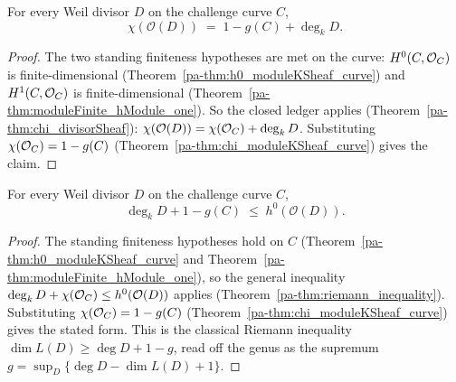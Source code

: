\begin{theorem}
  \label{pa-thm:chi_divisorSheaf_curve}
  \leanok

  For every Weil divisor \(D\) on the challenge curve \(C\),
  \[
    \chi(\mathcal O(D)) \;=\; 1 - g(C) + \deg_k D .
  \]
\end{theorem}
\begin{proof}
  \leanok
  The two standing finiteness hypotheses are met on the curve: \(H^0(C, \mathcal{O}_{C})\) is
  finite-dimensional (Theorem~\ref{pa-thm:h0_moduleKSheaf_curve}) and \(H^1(C, \mathcal{O}_{C})\) is
  finite-dimensional (Theorem~\ref{pa-thm:moduleFinite_hModule_one}). So the closed ledger applies
  (Theorem~\ref{pa-thm:chi_divisorSheaf}): \(\chi(\mathcal O(D)) = \chi(\mathcal{O}_{C}) + \deg_k D\).
  Substituting \(\chi(\mathcal{O}_{C}) = 1 - g(C)\) (Theorem~\ref{pa-thm:chi_moduleKSheaf_curve}) gives
  the claim.
\end{proof}

\begin{theorem}
  \label{pa-thm:riemann_inequality_curve}
  \leanok


  For every Weil divisor \(D\) on the challenge curve \(C\),
  \[
    \deg_k D + 1 - g(C) \;\le\; h^0(\mathcal O(D)).
  \]
\end{theorem}
\begin{proof}
  \leanok
  The standing finiteness hypotheses hold on \(C\) (Theorem~\ref{pa-thm:h0_moduleKSheaf_curve} and
  Theorem~\ref{pa-thm:moduleFinite_hModule_one}), so the general inequality
  \(\deg_k D + \chi(\mathcal{O}_{C}) \le h^0(\mathcal O(D))\) applies
  (Theorem~\ref{pa-thm:riemann_inequality}). Substituting \(\chi(\mathcal{O}_{C}) = 1 - g(C)\)
  (Theorem~\ref{pa-thm:chi_moduleKSheaf_curve}) gives the stated form. This is the classical Riemann
  inequality \(\dim L(D) \ge \deg D + 1 - g\), read off the genus as the supremum
  \(g = \sup_D\{\deg D - \dim L(D) + 1\}\).
\end{proof}

